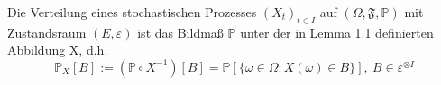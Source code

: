 Die Verteilung eines stochastischen Prozesses $(X_{t})_{t\in I}$ auf $(\Omega, \mathfrak{F}, \mathbb{P})$ mit Zustandsraum $(E, \varepsilon)$ ist das Bildmaß $\mathbb{P}$ unter der in Lemma 1.1 definierten Abbildung X, d.h.
\begin{equation*} 
{{\mathbb{P}}_{X}}[B] := (\mathbb{P} \circ X^{-1})[B] = \mathbb{P}[ \lbrace \omega \in \Omega : X(\omega) \in B\rbrace] , \: B \in \varepsilon^{ \otimes I}
\end{equation*}